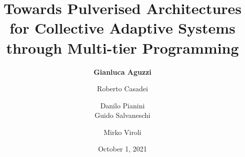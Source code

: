 \title{Towards Pulverised Architectures for Collective Adaptive Systems through Multi-tier Programming}
\author[G.Aguzzi]{
  \textbf{Gianluca Aguzzi} \and
  Roberto Casadei \and
  Danilo Pianini \\
  Guido Salvaneschi \and
  Mirko Viroli
}
\date{October 1, 2021}